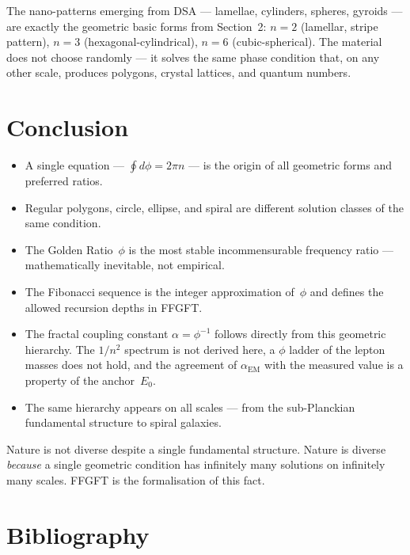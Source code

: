 The nano-patterns emerging from DSA — lamellae, cylinders, spheres,
gyroids — are exactly the geometric basic forms from Section~2:
$n=2$ (lamellar, stripe pattern), $n=3$ (hexagonal-cylindrical),
$n=6$ (cubic-spherical). The material does not choose randomly —
it solves the same phase condition that, on any other scale,
produces polygons, crystal lattices, and quantum numbers.

\section{Conclusion}

\begin{itemize}
  \item A single equation — $\oint d\phi = 2\pi n$ — is the
        origin of all geometric forms and preferred ratios.
  \item Regular polygons, circle, ellipse, and spiral are different
        solution classes of the same condition.
  \item The Golden Ratio~$\phi$ is the most stable incommensurable
        frequency ratio — mathematically inevitable, not empirical.
  \item The Fibonacci sequence is the integer approximation of~$\phi$
        and defines the allowed recursion depths in FFGFT.
  \item The fractal coupling constant $\alpha = \phi^{-1}$ follows directly
        from this geometric hierarchy. The $1/n^2$ spectrum is not derived
        here, a $\phi$ ladder of the lepton masses does not hold, and the
        agreement of $\alpha_\text{EM}$ with the measured value is a
        property of the anchor~$E_0$.
  \item The same hierarchy appears on all scales — from the
        sub-Planckian fundamental structure to spiral galaxies.
\end{itemize}

\begin{keybox}
Nature is not diverse despite a single fundamental structure.
Nature is diverse \emph{because} a single geometric condition
has infinitely many solutions on infinitely many scales.
FFGFT is the formalisation of this fact.
\end{keybox}

\newpage
\section*{Bibliography}

